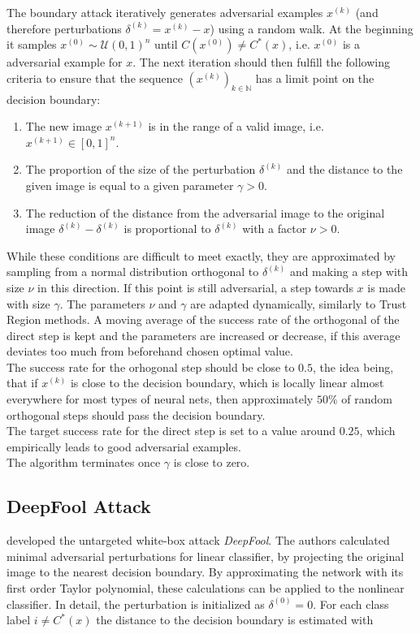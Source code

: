 The boundary attack iteratively generates adversarial examples $x^{(k)}$ (and therefore perturbations $\delta^{(k)} = x^{(k)} - x$) using a random walk. At the beginning it samples $x^{(0)} \sim \mathcal{U}(0,1)^n$ until $C(x^{(0)}) \neq C^*(x)$, i.e. $x^{(0)}$ is a adversarial example for $x$.
The next iteration should then fulfill the following criteria to ensure that the sequence $(x^{(k)})_{k \in \mathbb{N}}$ has a limit point on the decision boundary:

\begin{enumerate}
	\item The new image $x^{(k+1)}$ is in the range of a valid image,
	i.e. $x^{(k+1)}\in [0,1]^n$.
	\item The proportion of the size of the perturbation $\delta^{(k)}$
	and the distance to the given image is equal to a given parameter
	$\gamma > 0$.
	\item The reduction of the distance from the adversarial image to the
	original image $\delta^{(k)} - \delta^{(k)}$ is proportional to
	$\delta^{(k)}$ with a factor $\nu>0$.
\end{enumerate}

While these conditions are difficult to meet exactly, they are approximated by sampling from a normal distribution orthogonal to $\delta^{(k)}$ and making a step with size $\nu$ in this direction. If this point is still adversarial, a step towards $x$ is made with size $\gamma$. The parameters $\nu$ and $\gamma$ are adapted dynamically, similarly to Trust Region methods.
A moving average of the success rate of the orthogonal of the direct step is kept and the parameters are increased or decrease, if this average deviates too much from beforehand chosen optimal value. \\
The success rate for the orhogonal step should be close to $0.5$, the idea being, that if $x^{(k)}$ is close to the decision boundary, which is locally linear almost everywhere for most types of neural nets, then approximately $50\%$ of random orthogonal steps should pass the decision boundary. \\
The target success rate for the direct step is set to a value around $0.25$, which empirically leads to good adversarial examples. \\
The algorithm terminates once $\gamma$ is close to zero.

\subsection{DeepFool Attack}
\citet{deepfool} developed the untargeted white-box attack \emph{DeepFool}.
The authors calculated minimal adversarial perturbations for linear classifier, by projecting the original image to the nearest decision boundary. By approximating the network with its first order Taylor polynomial, these calculations can be applied to the nonlinear classifier.
In detail, the perturbation is initialized as $\delta^{(0)} = 0$. For each class label $i \neq C^*(x)$ the distance to the decision boundary is estimated with

